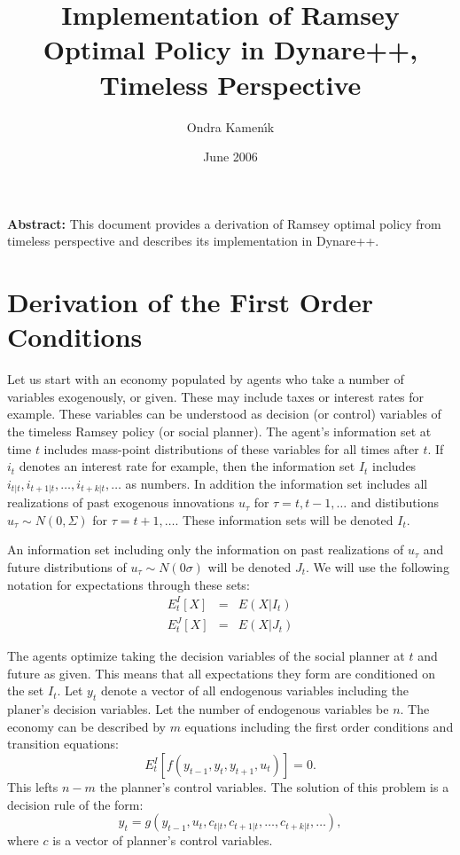 \documentclass[10pt]{article}
\begin{document}
\title{Implementation of Ramsey Optimal Policy in Dynare++, Timeless Perspective}

\author{Ondra Kamen\'\i k}

\date{June 2006}
\maketitle

\textbf{Abstract:} This document provides a derivation of Ramsey
optimal policy from timeless perspective and describes its
implementation in Dynare++.

\section{Derivation of the First Order Conditions}

Let us start with an economy populated by agents who take a number of
variables exogenously, or given. These may include taxes or interest
rates for example. These variables can be understood as decision (or control)
variables of the timeless Ramsey policy (or social planner). The agent's
information set at time $t$ includes mass-point distributions of these
variables for all times after $t$. If $i_t$ denotes an interest rate
for example, then the information set $I_t$ includes
$i_{t|t},i_{t+1|t},\ldots,i_{t+k|t},\ldots$ as numbers. In addition
the information set includes all realizations of past exogenous
innovations $u_\tau$ for $\tau=t,t-1,\ldots$ and distibutions
$u_\tau\sim N(0,\Sigma)$ for $\tau=t+1,\ldots$. These information sets will be denoted $I_t$.

An information set including only the information on past realizations
of $u_\tau$ and future distributions of $u_\tau\sim N(0\sigma)$ will
be denoted $J_t$. We will use the following notation for expectations
through these sets:
\begin{eqnarray*}
E^I_t[X] &=& E(X|I_t)\\
E^J_t[X] &=& E(X|J_t)
\end{eqnarray*}

The agents optimize taking the decision variables of the social
planner at $t$ and future as given. This means that all expectations
they form are conditioned on the set $I_t$. Let $y_t$ denote a vector
of all endogenous variables including the planer's decision
variables. Let the number of endogenous variables be $n$. The economy
can be described by $m$ equations including the first order conditions
and transition equations:
\begin{equation}\label{constr}
E_t^I\left[f(y_{t-1},y_t,y_{t+1},u_t)\right] = 0.
\end{equation}
This lefts $n-m$
the planner's control variables. The solution of this problem is a
decision rule of the form:
\begin{equation}\label{agent_dr}
y_t=g(y_{t-1},u_t,c_{t|t},c_{t+1|t},\ldots,c_{t+k|t},\ldots),
\end{equation}
where $c$ is a vector of planner's control variables.
\end{document}
